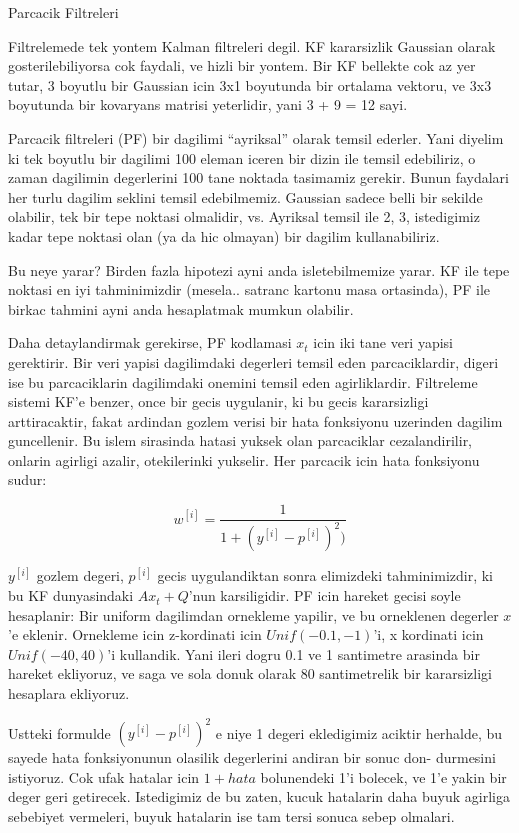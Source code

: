 \documentclass[12pt,fleqn]{article}\usepackage{../common}
\begin{document}
Parcacik Filtreleri

Filtrelemede tek yontem Kalman filtreleri degil. KF kararsizlik Gaussian
olarak gosterilebiliyorsa cok faydali, ve hizli bir yontem. Bir KF bellekte
cok az yer tutar, 3 boyutlu bir Gaussian icin 3x1 boyutunda bir ortalama
vektoru, ve 3x3 boyutunda bir kovaryans matrisi yeterlidir, yani 3 + 9 = 12
sayi.

Parcacik filtreleri (PF) bir dagilimi ``ayriksal'' olarak temsil
ederler. Yani diyelim ki tek boyutlu bir dagilimi 100 eleman iceren bir
dizin ile temsil edebiliriz, o zaman dagilimin degerlerini 100 tane
noktada tasimamiz gerekir.  Bunun faydalari her turlu dagilim seklini
temsil edebilmemiz. Gaussian sadece belli bir sekilde olabilir, tek bir
tepe noktasi olmalidir, vs. Ayriksal temsil ile 2, 3, istedigimiz kadar
tepe noktasi olan (ya da hic olmayan) bir dagilim kullanabiliriz.

Bu neye yarar? Birden fazla hipotezi ayni anda isletebilmemize yarar. KF
ile tepe noktasi en iyi tahminimizdir (mesela.. satranc kartonu masa
ortasinda), PF ile birkac tahmini ayni anda hesaplatmak mumkun olabilir.

Daha detaylandirmak gerekirse, PF kodlamasi $x_t$ icin iki tane veri yapisi
gerektirir. Bir veri yapisi dagilimdaki degerleri temsil eden
parcaciklardir, digeri ise bu parcaciklarin dagilimdaki onemini temsil eden
agirliklardir.  Filtreleme sistemi KF'e benzer, once bir gecis uygulanir,
ki bu gecis kararsizligi arttiracaktir, fakat ardindan gozlem verisi bir
hata fonksiyonu uzerinden dagilim guncellenir. Bu islem sirasinda hatasi
yuksek olan parcaciklar cezalandirilir, onlarin agirligi azalir,
otekilerinki yukselir. Her parcacik icin hata fonksiyonu sudur:

\[ 
w^{[i]} = \frac{1}{1 + (y^{[i]} - p^{[i]})^2  )}
 \]

$y^{[i]}$ gozlem degeri, $p^{[i]}$ gecis uygulandiktan sonra elimizdeki
tahminimizdir, ki bu KF dunyasindaki $Ax_t + Q$'nun karsiligidir. PF icin
hareket gecisi soyle hesaplanir: Bir uniform dagilimdan ornekleme yapilir,
ve bu orneklenen degerler $x$'e eklenir. Ornekleme icin z-kordinati icin
$Unif (-0.1, -1)$'i, x kordinati icin $Unif (-40, 40)$'i kullandik. Yani
ileri dogru 0.1 ve 1 santimetre arasinda bir hareket ekliyoruz, ve saga ve
sola donuk olarak 80 santimetrelik bir kararsizligi hesaplara ekliyoruz.

Ustteki formulde $(y^{[i]} - p^{[i]})^2$ e niye 1 degeri ekledigimiz
aciktir herhalde, bu sayede hata fonksiyonunun olasilik degerlerini andiran
bir sonuc don- durmesini istiyoruz. Cok ufak hatalar icin $1 + hata$
bolunendeki 1'i bolecek, ve 1'e yakin bir deger geri getirecek. Istedigimiz
de bu zaten, kucuk hatalarin daha buyuk agirliga sebebiyet vermeleri, buyuk
hatalarin ise tam tersi sonuca sebep olmalari.
\end{document}
